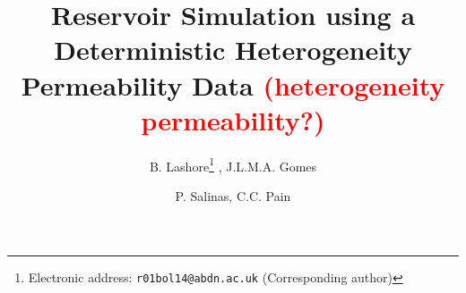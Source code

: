 \documentclass{article}
\newcommand{\red}{\textcolor{red}}
\begin{document}
\title{Reservoir Simulation using a Deterministic Heterogeneity Permeability Data \red{(heterogeneity permeability?)}}


\author{B. Lashore\thanks{Electronic address: \texttt{r01bol14@abdn.ac.uk} (Corresponding author)} , J.L.M.A. Gomes}

\author{P. Salinas, C.C. Pain}

\end{document}
